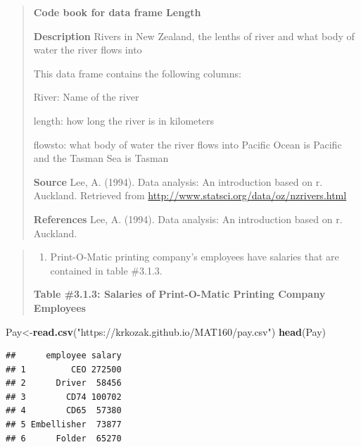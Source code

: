 \documentclass[]{book}
\newenvironment{Shaded}{\begin{snugshade}}{\end{snugshade}}
\newcommand{\KeywordTok}[1]{\textcolor[rgb]{0.13,0.29,0.53}{\textbf{#1}}}
\newcommand{\NormalTok}[1]{#1}
\newcommand{\StringTok}[1]{\textcolor[rgb]{0.31,0.60,0.02}{#1}}
\providecommand{\tightlist}{%
  \setlength{\itemsep}{0pt}\setlength{\parskip}{0pt}}
\begin{document}
\begin{quote}
\textbf{Code book for data frame Length}

\textbf{Description}
Rivers in New Zealand, the lenths of river and what body of water the river flows into

This data frame contains the following columns:

River: Name of the river

length: how long the river is in kilometers

flowsto: what body of water the river flows into Pacific Ocean is Pacific and the Tasman Sea is Tasman

\textbf{Source}
Lee, A. (1994). Data analysis: An introduction based on r. Auckland. Retrieved from
\url{http://www.statsci.org/data/oz/nzrivers.html}

\textbf{References}
Lee, A. (1994). Data analysis: An introduction based on r. Auckland.
\end{quote}

\begin{quote}
\begin{enumerate}
\def\labelenumi{\arabic{enumi}.}
\setcounter{enumi}{2}
\tightlist
\item
  Print-O-Matic printing company's employees have salaries that are contained in table \#3.1.3.
\end{enumerate}

\textbf{Table \#3.1.3: Salaries of Print-O-Matic Printing Company Employees}
\end{quote}

\begin{Shaded}
\begin{Highlighting}[]
\NormalTok{Pay<-}\KeywordTok{read.csv}\NormalTok{(}\StringTok{"https://krkozak.github.io/MAT160/pay.csv"}\NormalTok{)}
\KeywordTok{head}\NormalTok{(Pay)}
\end{Highlighting}
\end{Shaded}

\begin{verbatim}
##      employee salary
## 1         CEO 272500
## 2      Driver  58456
## 3        CD74 100702
## 4        CD65  57380
## 5 Embellisher  73877
## 6      Folder  65270
\end{verbatim}
\end{document}
